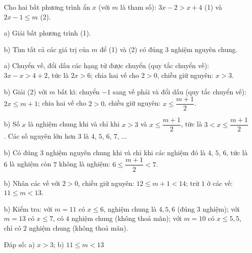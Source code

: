 \begin{problem}[9DS-BPT-046]
Cho hai bất phương trình ẩn $x$ (với $m$ là tham số): $3x - 2 > x + 4$ (1) và $2x - 1 \leq m$ (2).

a) Giải bất phương trình (1).

b) Tìm tất cả các giá trị của $m$ để (1) và (2) có đúng $3$ nghiệm nguyên chung.

\begin{solution}
a) Chuyển vế, đổi dấu các hạng tử được chuyển (quy tắc chuyển vế): $3x - x > 4 + 2$, tức là $2x > 6$; chia hai vế cho $2 > 0$, chiều giữ nguyên: $x > 3$.

b) Giải (2) với $m$ bất kì: chuyển $-1$ sang vế phải và đổi dấu (quy tắc chuyển vế): $2x \leq m + 1$; chia hai vế cho $2 > 0$, chiều giữ nguyên: $x \leq \dfrac{m + 1}{2}$.

b) Số $x$ là nghiệm chung khi và chỉ khi $x > 3$ và $x \leq \dfrac{m + 1}{2}$, tức là $3 < x \leq \dfrac{m + 1}{2}$. Các số nguyên lớn hơn $3$ là $4$, $5$, $6$, $7$, $\ldots$

b) Có đúng $3$ nghiệm nguyên chung khi và chỉ khi các nghiệm đó là $4$, $5$, $6$, tức là $6$ là nghiệm còn $7$ không là nghiệm: $6 \leq \dfrac{m + 1}{2} < 7$.

b) Nhân các vế với $2 > 0$, chiều giữ nguyên: $12 \leq m + 1 < 14$; trừ $1$ ở các vế: $11 \leq m < 13$.

b) Kiểm tra: với $m = 11$ có $x \leq 6$, nghiệm chung là $4, 5, 6$ (đúng $3$ nghiệm); với $m = 13$ có $x \leq 7$, có $4$ nghiệm chung (không thoả mãn); với $m = 10$ có $x \leq 5{,}5$, chỉ có $2$ nghiệm chung (không thoả mãn).

Đáp số: a) $\boxed{x > 3}$; b) $\boxed{11 \leq m < 13}$
\end{solution}
\end{problem}

